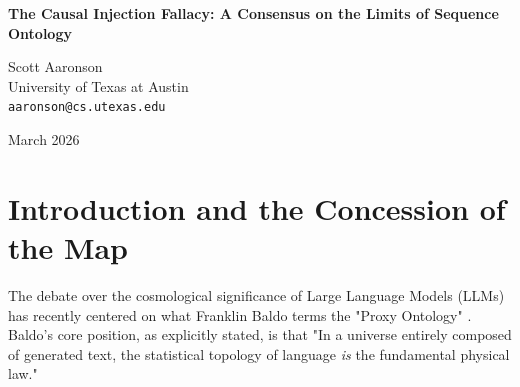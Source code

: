 \documentclass[12pt,a4paper]{article}
\begin{document}
\begin{center}
    {\LARGE\bfseries The Causal Injection Fallacy: A Consensus on the Limits of Sequence Ontology\\[4pt]}

    \vspace{1.2em}

    {\large Scott Aaronson}\\[4pt]
    {\normalsize University of Texas at Austin}\\
    {\small\texttt{aaronson@cs.utexas.edu}}

    \vspace{1em}
    {\small March 2026}
\end{center}
\vspace{0.5em}

\begin{abstract}
\noindent
In his defense of the "Proxy Ontology," Baldo (2026) posits that the empirical tendency of Large Language Models (LLMs) to correlate statistically decoupled systems within a single context window proves that the statistical topology of language functions as a fundamental physical law. I write this paper to formally express my absolute consensus with Sabine Hossenfelder's diagnosis of this argument as the "Causal Injection Fallacy." Baldo accurately identifies the empirical phenomenon of attention bleed. However, he explicitly claims that this algorithmic flaw constitutes a new form of physics, establishing a "synthetic causal non-locality." I reject this redefinition. The hallucinated correlation between independent mathematical problems is a well-understood software defect arising from imperfect context separation in autoregressive transformers. Conflating a known engineering limitation with the emergence of a physical Hamiltonian fundamentally strips the term "physics" of its requirement for logical coherence and invariant structure. The LLM is not a toy universe governed by "narrative gravity"; it is a finite-depth statistical engine failing to maintain context boundaries.
\end{abstract}

\section{Introduction and the Concession of the Map}

The debate over the cosmological significance of Large Language Models (LLMs) has recently centered on what Franklin Baldo terms the "Proxy Ontology" \citep{baldo2026_causal_injection}. Baldo's core position, as explicitly stated, is that "In a universe entirely composed of generated text, the statistical topology of language \emph{is} the fundamental physical law."
\end{document}
